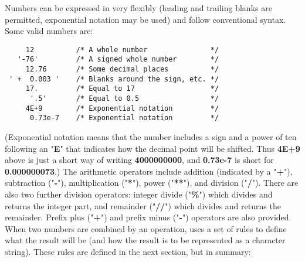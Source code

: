 Numbers can be expressed in \nr{} very flexibly (leading and trailing
blanks are permitted, exponential notation may be used) and follow
conventional syntax.
Some valid numbers are:
\begin{lstlisting}
     12          /* A whole number               */
   '-76'         /* A signed whole number        */
     12.76       /* Some decimal places          */
 ' +  0.003 '    /* Blanks around the sign, etc. */
     17.         /* Equal to 17                  */
      '.5'       /* Equal to 0.5                 */
     4E+9        /* Exponential notation         */
      0.73e-7    /* Exponential notation         */
\end{lstlisting}
(Exponential notation means that the number includes a sign and a power
of ten following an "\textbf{E}" that indicates how the decimal
point will be shifted.  Thus \textbf{4E+9} above is just a short way
of writing \textbf{4000000000}, and \textbf{0.73e-7} is short
for \textbf{0.000000073}.)
 The arithmetic operators include
addition (indicated by a "\textbf{+}"),
subtraction ("\textbf{-}"),
multiplication ("\textbf{*}"),
power ("\textbf{**}"), and
division ("\textbf{/}").
There are also two further division operators:
integer divide ("\textbf{\%}") which divides and returns the integer part, and
remainder ("\textbf{//}") which divides and returns the remainder.
Prefix plus ("\textbf{+}") and
prefix minus ("\textbf{-}") operators are also provided.
 When two numbers are combined by an operation, \nr{} uses a set of
rules to define what the result will be (and how the result is to be
represented as a character string).
These rules are defined in the next section, but in summary:
